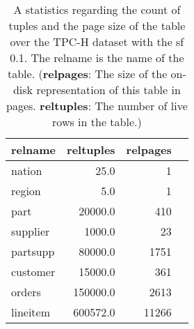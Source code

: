 \begin{table*}[h!]
\centering
\caption[Table statistics sample with the \acrshort{sf} 0.1]{A statistics regarding the count of tuples and the page size of the table over the TPC-H dataset with the \acrshort{sf} 0.1. The relname is the
name of the table. (\textbf{relpages}: The size of the on-disk representation of
this table in pages. \textbf{reltuples}: The number of live rows in the table.)}
\begin{tabular}{lrrr}
    \toprule   
  \textbf{relname}&\textbf{reltuples}&\textbf{relpages}\\
    \midrule
nation      & 25.0      & 1     \\
region      & 5.0       & 1     \\
part        & 20000.0   & 410   \\
supplier    & 1000.0    & 23    \\
partsupp    & 80000.0   & 1751  \\
customer    & 15000.0   & 361   \\
orders      & 150000.0  & 2613  \\
lineitem    & 600572.0  & 11266 \\
      \bottomrule
\end{tabular}
 \label{tab:tbl-eval-tpch-stas-list}
\end{table*}
